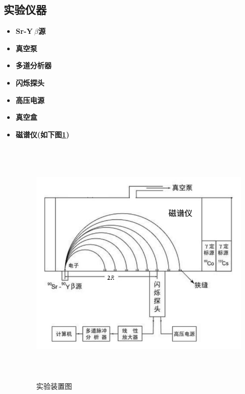 \documentclass[a4paper]{article}
\begin{document}
\subsection{实验仪器}\label{sub:sysover}
\begin{itemize}
\item{\textbf{Sr-Y$\ \beta$源}}
\item{\textbf{真空泵}}
\item{\textbf{多道分析器}}
\item{\textbf{闪烁探头}}
\item{\textbf{高压电源}}
\item{\textbf{真空盒}}
\item{\textbf{磁谱仪(如下图\ref{fig:fig1})}}
\begin{figure}[ht]
 \centering
 \includegraphics[height=12cm, width=14cm]{images/app.png}
 \caption{实验装置图}
 \label{fig:fig1}
\end{figure}\\\\
\end{itemize}

\newpage
\end{document}
